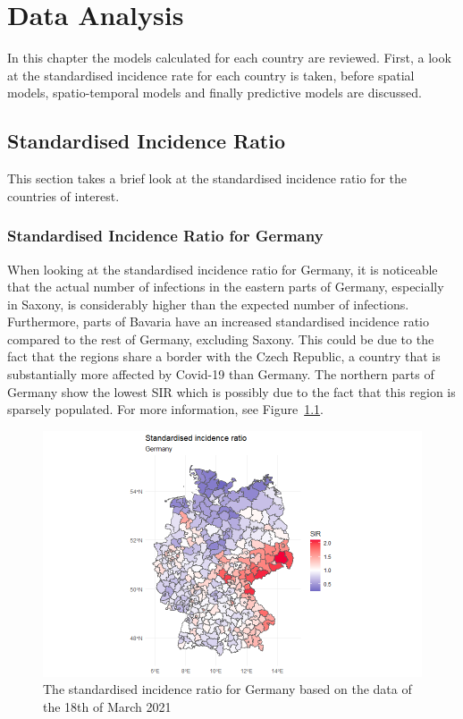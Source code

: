 %
\chapter{Data Analysis}
\label{sec:analysis}
In this chapter the models calculated for each country are reviewed. First, a look at the standardised incidence rate for each country is taken, before spatial models, spatio-temporal models and finally predictive models are discussed.
\section{Standardised Incidence Ratio}
This section takes a brief look at the standardised incidence ratio for the countries of interest.
\subsection{Standardised Incidence Ratio for Germany}
When looking at the standardised incidence ratio for Germany, it is noticeable that the actual number of infections in the eastern parts of Germany, especially in Saxony, is considerably higher than the expected number of infections. Furthermore, parts of Bavaria have an increased standardised incidence ratio compared to the rest of Germany, excluding Saxony. This could be due to the fact that the regions share a border with the Czech Republic, a country that is substantially more affected by Covid-19 than Germany. The northern parts of Germany show the lowest SIR which is possibly due to the fact that this region is sparsely populated. For more information, see Figure~\ref{sirgermany}.
%   
\begin{figure}[H]
  \centering
  \includegraphics[width = 1.2\textwidth]{sir_germany.png}
  \caption{The standardised incidence ratio for Germany based on the data of the 18th of March 2021}
  \label{sirgermany}
\end{figure}
